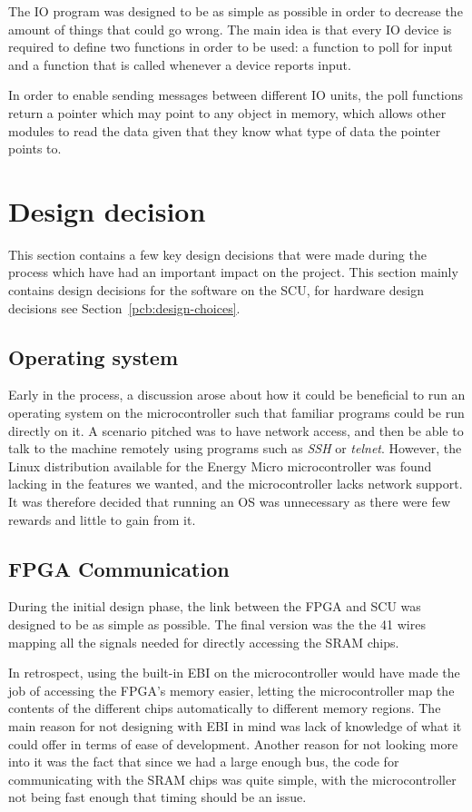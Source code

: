 The IO program was designed to be as simple as possible in order to decrease the amount of things that could go wrong.
The main idea is that every IO device is required to define two functions in order to be used: a function to poll for input and a function that is called whenever a device reports input.

In order to enable sending messages between different IO units, the poll functions return a pointer which may point to any object in memory, which allows other modules to read the data given that they know what type of data the pointer points to.

\section{Design decision}
This section contains a few key design decisions that were made during the process which have had an important impact on the project.
This section mainly contains design decisions for the software on the SCU, for hardware design decisions see Section~\ref{pcb:design-choices}.

\subsection{Operating system}
Early in the process, a discussion arose about how it could be beneficial to run an operating system on the microcontroller such that familiar programs could be run directly on it.
A scenario pitched was to have network access, and then be able to talk to the machine remotely using programs such as \textit{SSH} or \textit{telnet}.
However, the Linux distribution available for the Energy Micro microcontroller was found lacking in the features we wanted, and the microcontroller lacks network support.
It was therefore decided that running an OS was unnecessary as there were few rewards and little to gain from it.

\subsection{FPGA Communication}
During the initial design phase, the link between the FPGA and SCU was designed to be as simple as possible.
The final version was the the 41 wires mapping all the signals needed for directly accessing the SRAM chips.

In retrospect, using the built-in \gls{EBI} on the microcontroller would have made the job of accessing the FPGA's memory easier, letting the microcontroller map the contents of the different chips automatically to different memory regions.
The main reason for not designing with EBI in mind was lack of knowledge of what it could offer in terms of ease of development.
Another reason for not looking more into it was the fact that since we had a large enough bus, the code for communicating with the SRAM chips was quite simple, with the microcontroller not being fast enough that timing should be an issue.

